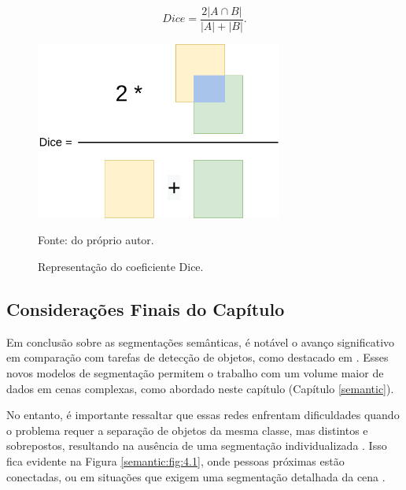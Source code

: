 \begin{equation}
    \label{semantic:eq:6}
    Dice = \frac{2|A \cap B|}{|A| + |B|}.
\end{equation}

\begin{figure}[H]
    \centering
    \caption{Representação do coeficiente Dice.}
    \includegraphics[height=2.3in]{recursos/imagens/semantic/dice.png}
    \label{semantic:fig:2}

    Fonte: do próprio autor.
\end{figure}

\subsection{Considerações Finais do Capítulo}
\label{semantic:conclusion}
Em conclusão sobre as segmentações semânticas, é notável o avanço significativo em comparação com tarefas de detecção de objetos, como destacado em \cite{Vaillant1994}. Esses novos modelos de segmentação permitem o trabalho com um volume maior de dados em cenas complexas, como abordado neste capítulo (Capítulo \ref{semantic}).

No entanto, é importante ressaltar que essas redes enfrentam dificuldades quando o problema requer a separação de objetos da mesma classe, mas distintos e sobrepostos, resultando na ausência de uma segmentação individualizada \citep{Kirillov2019a}. Isso fica evidente na Figura \ref{semantic:fig:4.1}, onde pessoas próximas estão conectadas, ou em situações que exigem uma segmentação detalhada da cena \citep{Ghosh2019}.

